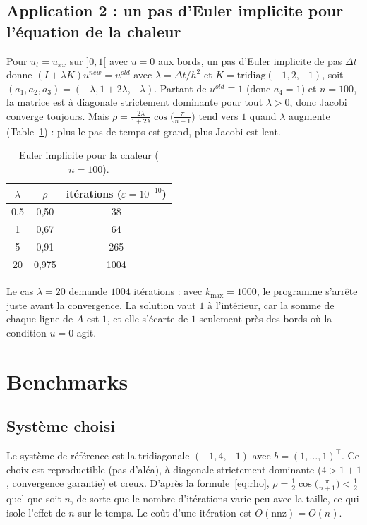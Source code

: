 \documentclass[a4paper]{scrartcl}
\begin{document}
\subsection{Application 2 : un pas d'Euler implicite pour l'équation de la chaleur}

Pour $u_t=u_{xx}$ sur $]0,1[$ avec $u=0$ aux bords, un pas d'Euler implicite de pas 
$\Delta t$ donne $(I+\lambda K)u^{new}=u^{old}$ avec $\lambda=\Delta t/h^2$ et 
$K=\mathrm{tridiag}(-1,2,-1)$, soit $(a_1,a_2,a_3)=(-\lambda,1+2\lambda,-\lambda)$. 
Partant de $u^{old}\equiv1$ (donc $a_4=1$) et $n=100$, la matrice est à diagonale strictement dominante pour tout 
$\lambda>0$, donc Jacobi converge toujours. 
Mais $\rho=\frac{2\lambda}{1+2\lambda}\cos\!\big(\frac{\pi}{n+1}\big)$ tend vers $1$ quand $\lambda$ 
augmente (Table~\ref{tbl:chaleur}) : plus le pas de temps est grand, plus Jacobi est lent.
\begin{table}[!ht]
\centering
\begin{tabular}{|c|c|c|}
\hline
$\lambda$ & $\rho$ & itérations ($\varepsilon=10^{-10}$) \\ \hline
0,5 & 0,50 & 38 \\ \hline
1 & 0,67 & 64 \\ \hline
5 & 0,91 & 265 \\ \hline
20 & 0,975 & 1004 \\ \hline
\end{tabular}
\caption{Euler implicite pour la chaleur ($n=100$).}
\label{tbl:chaleur}
\end{table}
Le cas $\lambda=20$ demande $1004$ itérations : avec $k_{\max}=1000$, le programme s'arrête juste avant la convergence. 
La solution vaut $1$ à l'intérieur, car la somme de chaque ligne de $A$ est $1$, et elle s'écarte de $1$ seulement 
près des bords où la condition $u=0$ agit.

\section{Benchmarks}

\subsection{Système choisi}

Le système de référence est la tridiagonale $(-1,4,-1)$ avec $b=(1,\dots,1)^\top$. Ce choix est reproductible (pas d'aléa), 
à diagonale strictement dominante ($4>1+1$, convergence garantie) et creux. 
D'après la formule~\eqref{eq:rho}, $\rho=\frac12\cos\!\big(\frac{\pi}{n+1}\big)<\frac12$ quel que soit $n$, 
de sorte que le nombre d'itérations varie peu avec la taille, ce qui isole l'effet de $n$ sur le temps. 
Le coût d'une itération est $O(\text{nnz})=O(n)$.
\end{document}
